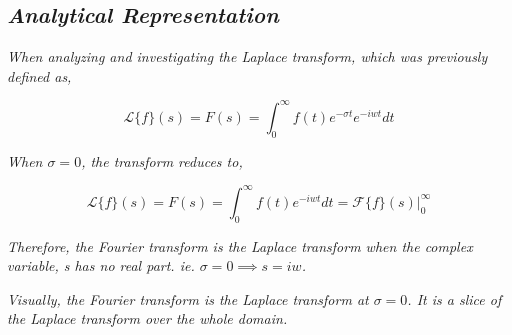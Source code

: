 

\subsection{\textit{Analytical Representation}}

	\textit{When analyzing and investigating the Laplace transform, which was previously defined as,}
	
		$$\mathcal{L}\{f\}(s) = F(s) = \int_0^{\infty}f(t)e^{-\sigma t}e^{-iwt} dt$$	
	
	\textit{When $\sigma = 0$, the transform reduces to,}	
	
		$$\mathcal{L}\{f\}(s) = F(s) = \int_0^{\infty}f(t)e^{-iwt} dt = \left.\mathcal{F}\{f\}(s)\right|_{0}^{\infty}$$

	\textit{Therefore, the Fourier transform is the Laplace transform when the complex variable, s has no real part. ie. $\sigma = 0 \implies s = iw$.}

	\textit{Visually, the Fourier transform is the Laplace transform at $\sigma = 0$. It is a slice of the Laplace transform over the whole domain.}



